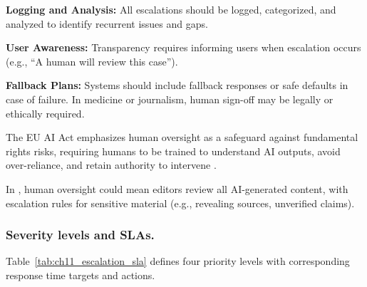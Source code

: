 \textbf{Logging and Analysis:} All escalations should be logged, categorized, and analyzed to identify recurrent issues and gaps.

\textbf{User Awareness:} Transparency requires informing users when escalation occurs (e.g., ``A human will review this case'').

\textbf{Fallback Plans:} Systems should include fallback responses or safe defaults in case of failure. In medicine or journalism, human sign-off may be legally or ethically required.

The EU AI Act emphasizes human oversight as a safeguard against fundamental rights risks, requiring humans to be trained to understand AI outputs, avoid over-reliance, and retain authority to intervene \cite{euai2025}.

In \ishtar{}, human oversight could mean editors review all AI-generated content, with escalation rules for sensitive material (e.g., revealing sources, unverified claims).

\subsubsection{Severity levels and SLAs.}\label{sec:ch11_sla}

Table~\ref{tab:ch11_escalation_sla} defines four priority levels with corresponding response time targets and actions.

